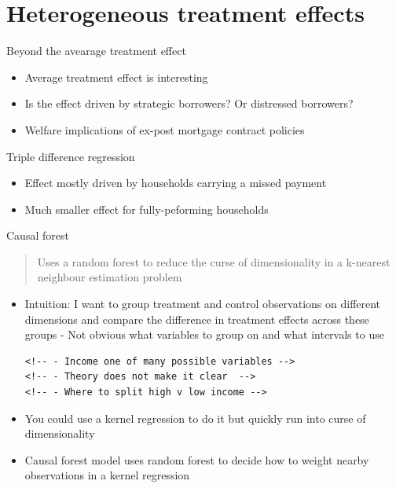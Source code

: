 \documentclass[ignorenonframetext,aspectratio=169]{beamer}
\begin{document}
\section{Heterogeneous treatment
effects}\label{heterogeneous-treatment-effects}

\begin{frame}{Beyond the avearage treatment effect}

\begin{itemize}
\item
  Average treatment effect is interesting
\item
  Is the effect driven by strategic borrowers? Or distressed borrowers?
\item
  Welfare implications of ex-post mortgage contract policies
\end{itemize}

\end{frame}

\begin{frame}{Triple difference regression}

\begin{itemize}
\item
  Effect mostly driven by households carrying a missed payment
\item
  Much smaller effect for fully-peforming households
\end{itemize}

\tiny\centering

\end{frame}

\begin{frame}[fragile]{Causal forest}

\begin{quote}
Uses a random forest to reduce the curse of dimensionality in a
k-nearest neighbour estimation problem
\end{quote}

\begin{itemize}
\item
  Intuition: I want to group treatment and control observations on
  different dimensions and compare the difference in treatment effects
  across these groups - Not obvious what variables to group on and what
  intervals to use

\begin{verbatim}
<!-- - Income one of many possible variables -->
<!-- - Theory does not make it clear  -->
<!-- - Where to split high v low income -->
\end{verbatim}
\item
  You could use a kernel regression to do it but quickly run into curse
  of dimensionality 
\item
  Causal forest model uses random forest to decide how to weight nearby
  observations in a kernel regression
\end{itemize}

\end{frame}
\end{document}
